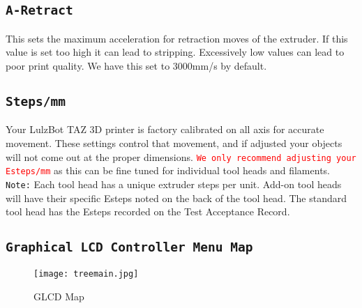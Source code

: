 \subsection{\texttt{A-Retract}} 
This sets the maximum acceleration for retraction moves of the extruder. If this value is set too high it can lead to stripping. Excessively low values can lead to poor print quality. We have this set to 3000mm/s\textsuperscript{} by default.

\subsection{\texttt{Steps/mm}}
Your LulzBot TAZ 3D printer is factory calibrated on all axis for accurate movement. These settings control that movement, and if adjusted your objects will not come out at the proper dimensions. \textcolor{red}{\texttt{We only recommend adjusting your Esteps/mm}} as this can be fine tuned for individual tool heads and filaments.
\texttt{Note:} Each tool head has a unique extruder steps per unit. Add-on tool heads will have their specific Esteps noted on the back of the tool head. The standard tool head has the Esteps recorded on the Test Acceptance Record.

\subsection{\texttt{Graphical LCD Controller Menu Map}}
\begin{figure}[H]
\centering
\texttt{[image: treemain.jpg]}
\caption{GLCD Map}
\label{fig:GLCD_Map}
\end{figure}




